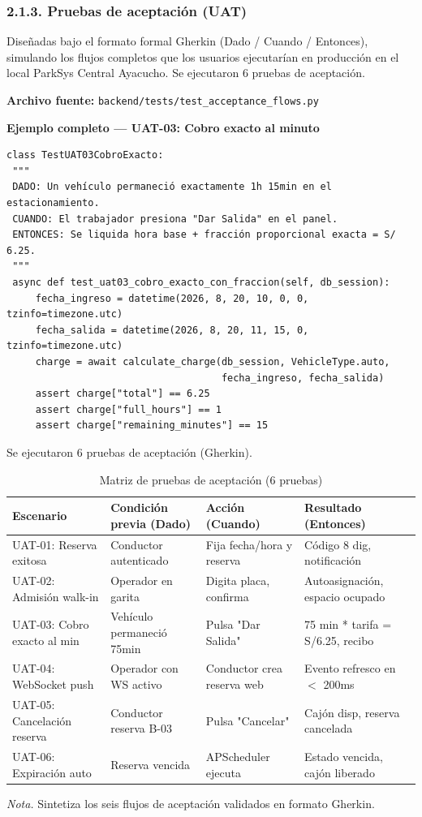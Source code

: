 \subsubsection{2.1.3. Pruebas de aceptación (UAT)}

Diseñadas bajo el formato formal Gherkin (Dado / Cuando / Entonces), simulando los flujos completos que los usuarios ejecutarían en producción en el local ParkSys Central Ayacucho. Se ejecutaron 6 pruebas de aceptación.

\textbf{Archivo fuente:} \texttt{backend/tests/test\_acceptance\_flows.py}

\textbf{Ejemplo completo — UAT-03: Cobro exacto al minuto}
\begin{verbatim}
class TestUAT03CobroExacto:
 """
 DADO: Un vehículo permaneció exactamente 1h 15min en el estacionamiento.
 CUANDO: El trabajador presiona "Dar Salida" en el panel.
 ENTONCES: Se liquida hora base + fracción proporcional exacta = S/ 6.25.
 """
 async def test_uat03_cobro_exacto_con_fraccion(self, db_session):
     fecha_ingreso = datetime(2026, 8, 20, 10, 0, 0, tzinfo=timezone.utc)
     fecha_salida = datetime(2026, 8, 20, 11, 15, 0, tzinfo=timezone.utc)
     charge = await calculate_charge(db_session, VehicleType.auto,
                                     fecha_ingreso, fecha_salida)
     assert charge["total"] == 6.25
     assert charge["full_hours"] == 1
     assert charge["remaining_minutes"] == 15
\end{verbatim}





Se ejecutaron 6 pruebas de aceptación (Gherkin).

\begin{table}[htbp]
\caption{Matriz de pruebas de aceptación (6 pruebas)}
\label{tab:matriz_uat}
\begin{tabular}{@{}p{4cm} p{3.5cm} p{3.5cm} p{4.5cm}@{}}
\toprule
\textbf{Escenario} & \textbf{Condición previa (Dado)} & \textbf{Acción (Cuando)} & \textbf{Resultado (Entonces)} \\
\midrule
UAT-01: Reserva exitosa & Conductor autenticado & Fija fecha/hora y reserva & Código 8 dig, notificación \\
UAT-02: Admisión walk-in & Operador en garita & Digita placa, confirma & Autoasignación, espacio ocupado \\
UAT-03: Cobro exacto al min & Vehículo permaneció 75min & Pulsa "Dar Salida" & 75 min * tarifa = S/6.25, recibo \\
UAT-04: WebSocket push & Operador con WS activo & Conductor crea reserva web & Evento refresco en $<$ 200ms \\
UAT-05: Cancelación reserva & Conductor reserva B-03 & Pulsa "Cancelar" & Cajón disp, reserva cancelada \\
UAT-06: Expiración auto & Reserva vencida & APScheduler ejecuta & Estado vencida, cajón liberado \\
\bottomrule
\end{tabular}
\par\vspace{0.2cm}
\textit{Nota.} Sintetiza los seis flujos de aceptación validados en formato Gherkin.
\end{table}

